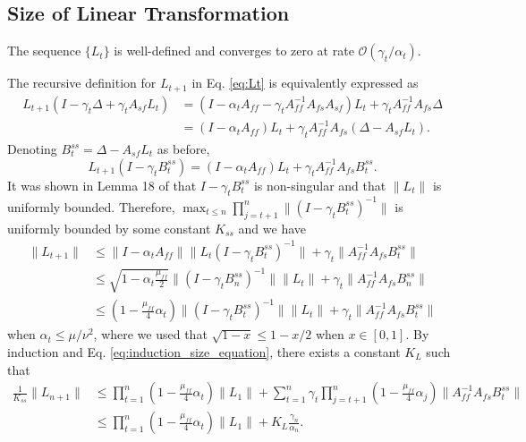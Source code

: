 \subsection{Size of Linear Transformation}
\begin{proposition}\label{prop:Lt_welldefined}
    The sequence $\{L_t\}$ is well-defined and converges to zero at rate $\mathcal{O}(\gamma_t/\alpha_t)$.
\end{proposition}
The recursive definition for $L_{t+1}$ in Eq. \eqref{eq:Lt} is equivalently expressed as 
\begin{align*}
    L_{t+1} (I - \gamma_t \Delta + \gamma_t A_{sf} L_t) 
    &= \left(I - \alpha_t A_{ff} - \gamma_t A_{ff}^{-1} A_{fs} A_{sf} \right) L_t + \gamma_t A_{ff}^{-1} A_{fs} \Delta 
    \\ & 
    = \left(I - \alpha_t A_{ff}\right) L_t + \gamma_t A_{ff}^{-1} A_{fs}(\Delta - A_{sf} L_t) .
\end{align*}
Denoting $B_t^{ss} = \Delta - A_{sf} L_t$ as before, 
\begin{equation}
    L_{t+1} (I - \gamma_t B_t^{ss}) = (I - \alpha_t A_{ff}) L_t + \gamma_t A_{ff}^{-1} A_{fs} B_t^{ss} .
\end{equation}
It was shown in Lemma 18 of \citep{kaledin2020finite} that $I - \gamma_t B_t^{ss}$ is non-singular and that $\lVert L_t \rVert$ is uniformly bounded.
Therefore, $ \max_{t \leq n} \prod_{j=t+1}^n \lVert (I - \gamma_t B_t^{ss})^{-1} \rVert$ is uniformly bounded by some constant $K_{ss}$ and we have
\begin{align*}
    \lVert L_{t+1} \rVert 
    &\leq \lVert I - \alpha_t A_{ff} \rVert \lVert L_t (I - \gamma_t B_t^{ss})^{-1} \rVert + \gamma_t \lVert A_{ff}^{-1} A_{fs} B_t^{ss} \rVert 
    \\ & \leq 
    \sqrt{1 - \alpha_t \frac{\mu_{ff}}{2}} \lVert (I - \gamma_t B_n^{ss})^{-1}\rVert \lVert L_t \rVert 
    + \gamma_t \lVert A_{ff}^{-1} A_{fs} B_n^{ss} \rVert 
    \\ & \leq \left(1 - \frac{\mu_{ff}}{4} \alpha_t\right) \lVert (I - \gamma_t B_t^{ss})^{-1} \rVert \lVert L_t \rVert + \gamma_t \lVert A_{ff}^{-1} A_{fs} B_t^{ss} \rVert 
\end{align*}
when $\alpha_t \leq \mu/\nu^2$, where we used that $\sqrt{1 - x} \leq 1 - x/2$ when $x \in [0, 1]$. 
By induction and Eq. \eqref{eq:induction_size_equation}, there exists a constant $K_L$ such that
\begin{align*}
    \frac{1}{K_{ss}}\lVert L_{n+1} \rVert 
    & \leq \prod_{t=1}^n \left(1 - \frac{\mu_{ff}}{4} \alpha_t \right) \lVert L_1 \rVert + \sum_{t=1}^n \gamma_t  \prod_{j=t+1}^n \left(1 - \frac{\mu_{ff}}{4} \alpha_j\right)  \lVert A_{ff}^{-1} A_{fs} B_t^{ss} \rVert 
    \\ & \leq 
    \prod_{t=1}^n \left(1 - \frac{\mu_{ff}}{4} \alpha_t \right) \lVert L_1 \rVert + K_L \frac{\gamma_n}{\alpha_n}
    .
\end{align*}



